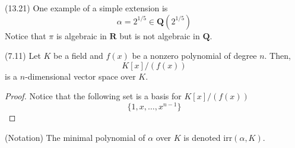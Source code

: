 \vspace{2ex}
\begin{ex}
(13.21) One example of a simple extension is
\[\alpha =2^{1/5}\in {\bm Q}(2^{1/5})\]
Notice that $\pi $ is algebraic in ${\bm R}$ but is not algebraic in ${\bm Q}$. 
\end{ex}
\vspace{2ex}
\begin{thm}
(7.11) Let $K$ be a field and $f(x)$ be a nonzero polynomial of degree $n$. Then,
\[K[x]/(f(x))\]
is a $n$-dimensional vector space over $K$.
\end{thm}
\vspace{2ex}
\begin{proof}
Notice that the following set is a basis for $K[x]/(f(x))$
\[\{1,x,\ldots ,x^{n-1} \}\]
\end{proof}
\vspace{2ex}
\begin{rmk}
(Notation) The minimal polynomial of $\alpha $ over $K$ is denoted $\mathrm{irr}(\alpha ,K)$.
\end{rmk}
\vspace{2ex}
